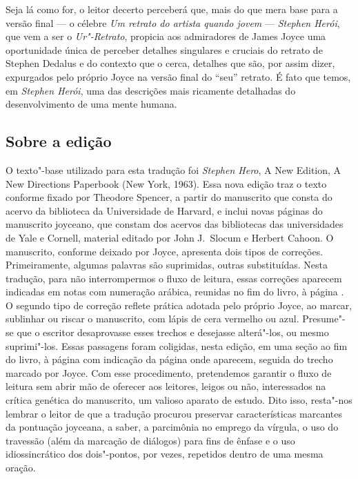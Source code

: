 Seja lá como for, o leitor decerto perceberá que, mais do que mera base
para a versão final --- o célebre \textit{Um retrato do artista quando
jovem} --- \textit{Stephen Herói}, que vem a ser o \textit{Ur"-Retrato},
propicia aos admiradores de James Joyce uma oportunidade única de
perceber detalhes singulares e cruciais do retrato de Stephen Dedalus		
e do contexto que o cerca, detalhes que são, por assim dizer,
expurgados pelo próprio Joyce na versão final do “seu” retrato.  É fato
que temos, em \textit{Stephen Herói}, uma das descrições mais ricamente
detalhadas do desenvolvimento de uma mente humana.


\subsection*{Sobre a edição}

O texto"-base utilizado para esta tradução foi \textit{Stephen Hero}, A New
Edition, A New Directions Paperbook (New York, 1963).  Essa nova edição traz o
texto conforme fixado por Theodore Spencer, a partir do manuscrito que consta
do acervo da biblioteca da Universidade de Harvard, e inclui novas páginas do
manuscrito joyceano, que constam dos acervos das bibliotecas das universidades
de Yale e Cornell, material editado por John J.~Slocum e Herbert Cahoon.  O
manuscrito, conforme deixado por Joyce, apresenta dois tipos de correções.
Primeiramente, algumas palavras são suprimidas, outras substituídas.  Nesta tradução, 
para não interrompermos o fluxo de leitura, essas correções aparecem indicadas em notas 
com numeração arábica, reunidas no fim do livro, à página \pageref{notas"-arabicas}.  
O segundo tipo de correção reflete prática adotada pelo próprio Joyce, ao marcar, sublinhar ou riscar o
manuscrito, com lápis de cera vermelho ou azul.  Presume"-se que o escritor
desaprovasse esses trechos e desejasse alterá"-los, ou mesmo suprimi"-los.
Essas passagens foram coligidas, nesta edição, em uma seção ao fim do livro, à página \pageref{passagens} 
com indicação da página onde aparecem, seguida do trecho marcado por Joyce. Com esse 
procedimento, pretendemos garantir o fluxo de leitura sem abrir mão de oferecer aos 
leitores, leigos ou não, interessados na crítica genética do manuscrito, um valioso 
aparato de estudo. Dito isso, resta"-nos lembrar o leitor de que a tradução procurou preservar
características marcantes da pontuação joyceana, a saber, a parcimônia no
emprego da vírgula, o uso do travessão (além da marcação de diálogos) para fins
de ênfase e o uso idiossincrático dos dois"-pontos, por vezes, repetidos dentro
de uma mesma oração.


